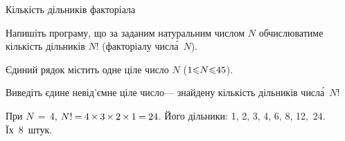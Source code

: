 \begin{problemAllDefault}{Кількість дільників факторіала}\label{task:divs-of-fact}

Напишіть програму, що за заданим натуральним числом $N$ обчислюватиме кількість 
дільників
$N!$ (факторіалу числ\'{а}~$N$).

\InputFile
Єдиний рядок містить одне ціле число $N$ (${1{\leqslant}N{\leqslant}45}$).

\myflfigaw{\begin{exampleSimple}{2em}{3em}%

\end{exampleSimple}\hspace*{-0.25em}}
\OutputFile
Виведіть єдине невід'ємне ціле число\nolinebreak[3] --- знайдену кількість дільників числ\'{а}~$N!$

\Note
При $N\,{=}\,4$,\hspace{0.125em plus 0.5em} $N!\dibbb{{=}}4\,{\times}\,3\,{\times}\,2\,{\times}\,1\dibbb{{=}}24$. 
Його
дільники: 1, 2, 3, 4, 6, 8, 12,~24. 
Їх~8~штук.

\end{problemAllDefault}